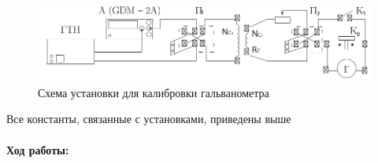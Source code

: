 \documentclass[a4paper,12pt]{article}
\begin{document}
\paragraph{}
\begin{figure}[h!]
\includegraphics[scale=1]{ustanovka_2.pdf}
\caption{Схема установки для калибровки гальванометра}
\label{ustanovka_2}
\end{figure}
Все константы, связанные с установками, приведены выше
\paragraph{Ход работы:}
\end{document}
